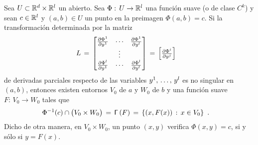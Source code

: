 \begin{teoFunImplicita}%
	\label{thm:funimplicita}
	Sea $U\subset\mathbb{R}^{d}\times\mathbb{R}^{l}$ un abierto. Sea
	$\Phi:\,U\rightarrow\mathbb{R}^{l}$ una funci\'{o}n suave (o de clase
	$C^{k}$) y sean $c\in\mathbb{R}^{l}$ y $(a,b)\in U$ un punto en la
	preimagen $\Phi(a,b)=c$. Si la transformaci\'{o}n determinada por
	la matriz
	\begin{align*}
		L & \,=\,
			\begin{bmatrix}
				\frac{\partial{\Phi^{1}}}{\partial{y^{1}}} & \cdots &
					\frac{\partial{\Phi^{1}}}{\partial{y^{l}}} \\
				& \vdots & \\
				\frac{\partial{\Phi^{l}}}{\partial{y^{1}}} & \cdots &
					\frac{\partial{\Phi^{l}}}{\partial{y^{l}}}
			\end{bmatrix}
		\,=\,\begin{bmatrix}\frac{\partial{\Phi^{i}}}{\partial{y^{j}}}\end{bmatrix}
	\end{align*}
	de derivadas parciales respecto de las variables $\lista*{y}{l}$ es
	no singular en $(a,b)$, entonces existen entornos $V_{0}$ de $a$
	y $W_{0}$ de $b$ y una funci\'{o}n suave $F:\,V_{0}\rightarrow W_{0}$
	tales que 
	\begin{align*}
		\Phi^{-1}(c)\cap\big(V_{0}\times W_{0}\big) & \,=\,\mathsf{\Gamma}\left(F\right)
			\,=\,\left\lbrace (x,F(x))\,:\,x\in V_{0}\right\rbrace
		\text{ .}
	\end{align*}
	Dicho de otra manera, en $V_{0}\times W_{0}$, un punto $(x,y)$
	verifica $\Phi(x,y)=c$, si y s\'{o}lo si $y=F(x)$.
\end{teoFunImplicita}

